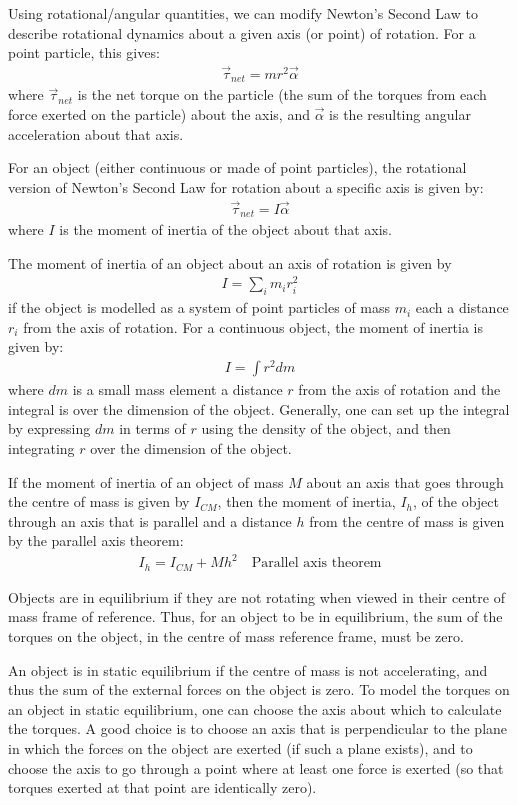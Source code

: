 Using rotational/angular quantities, we can modify Newton's Second Law to describe rotational dynamics about a given axis (or point) of rotation. For a point particle, this gives:
\begin{align*}
\vec \tau_{net} = mr^2 \vec\alpha
\end{align*}
where $\vec \tau_{net}$ is the net torque on the particle (the sum of the torques from each force exerted on the particle) about the axis, and $\vec\alpha$ is the resulting angular acceleration about that axis.

For an object (either continuous or made of point particles), the rotational version of Newton's Second Law for rotation about a specific axis is given by:
\begin{align*}
\vec \tau_{net} = I\vec\alpha
\end{align*}
where $I$ is the moment of inertia of the object about that axis.

The moment of inertia of an object about an axis of rotation is given by
\begin{align*}
I = \sum_i m_ir_i^2
\end{align*}
if the object is modelled as a system of point particles of mass $m_i$ each a distance $r_i$ from the axis of rotation. For a continuous object, the moment of inertia is given by:
\begin{align*}
I = \int r^2 dm
\end{align*}
where $dm$ is a small mass element a distance $r$ from the axis of rotation and the integral is over the dimension of the object. Generally, one can set up the integral by expressing $dm$ in terms of $r$ using the density of the object, and then integrating $r$ over the dimension of the object.

If the moment of inertia of an object of mass $M$ about an axis that goes through the centre of mass is given by $I_{CM}$, then the moment of inertia, $I_h$, of the object through an axis that is parallel and a distance $h$ from the centre of mass is given by the parallel axis theorem:
\begin{align*}
I_h = I_{CM} + Mh^2 \quad \text{Parallel axis theorem}
\end{align*}

Objects are in equilibrium if they are not rotating when viewed in their centre of mass frame of reference. Thus, for an object to be in equilibrium, the sum of the torques on the object, in the centre of mass reference frame, must be zero.

An object is in static equilibrium if the centre of mass is not accelerating, and thus the sum of the external forces on the object is zero. To model the torques on an object in static equilibrium, one can choose the axis about which to calculate the torques. A good choice is to choose an axis that is perpendicular to the plane in which the forces on the object are exerted (if such a plane exists), and to choose the axis to go through a point where at least one force is exerted (so that torques exerted at that point are identically zero).

